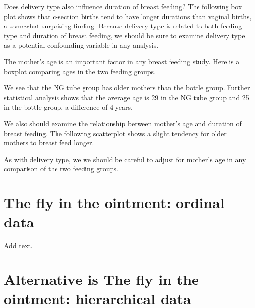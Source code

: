 \documentclass[
  letterpaper,
  DIV=11,
  numbers=noendperiod]{scrreprt}
\newenvironment{Shaded}{\begin{snugshade}}{\end{snugshade}}
\newcommand{\AttributeTok}[1]{\textcolor[rgb]{0.40,0.45,0.13}{#1}}
\newcommand{\DecValTok}[1]{\textcolor[rgb]{0.68,0.00,0.00}{#1}}
\newcommand{\FunctionTok}[1]{\textcolor[rgb]{0.28,0.35,0.67}{#1}}
\newcommand{\NormalTok}[1]{\textcolor[rgb]{0.00,0.23,0.31}{#1}}
\newcommand{\OtherTok}[1]{\textcolor[rgb]{0.00,0.23,0.31}{#1}}
\newcommand{\SpecialCharTok}[1]{\textcolor[rgb]{0.37,0.37,0.37}{#1}}
\newcommand{\StringTok}[1]{\textcolor[rgb]{0.13,0.47,0.30}{#1}}
\begin{document}
\begin{tcolorbox}
Does delivery type also influence duration of breast feeding? The
following box plot shows that c-section births tend to have longer
durations than vaginal births, a somewhat surprising finding. Because
delivery type is related to both feeding type and duration of breast
feeding, we should be sure to examine delivery type as a potential
confounding variable in any analysis.

The mother's age is an important factor in any breast feeding study.
Here is a boxplot comparing ages in the two feeding groups.

We see that the NG tube group has older mothers than the bottle group.
Further statistical analysis shows that the average age is 29 in the NG
tube group and 25 in the bottle group, a difference of 4 years.

We also should examine the relationship between mother's age and
duration of breast feeding. The following scatterplot shows a slight
tendency for older mothers to breast feed longer.

As with delivery type, we we should be careful to adjust for mother's
age in any comparison of the two feeding groups.

\section{The fly in the ointment: ordinal
data}\label{the-fly-in-the-ointment-ordinal-data}

Add text.

\section{Alternative is The fly in the ointment: hierarchical
data}\label{alternative-is-the-fly-in-the-ointment-hierarchical-data}

\begin{Shaded}
\end{Shaded}


\end{tcolorbox}
\end{document}
